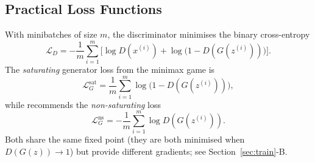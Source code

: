 \documentclass[conference]{IEEEtran}
\theoremstyle{plain}
\theoremstyle{definition}
\begin{document}
\subsection{Practical Loss Functions}
With minibatches of size $m$, the discriminator minimises the binary cross-entropy
\begin{equation}
\mathcal{L}_D=-\frac1m\sum_{i=1}^{m}\Big[\log D(x^{(i)})+\log\big(1-D(G(z^{(i)}))\big)\Big].
\label{eq:LD}
\end{equation}
The \emph{saturating} generator loss from the minimax game is
\begin{equation}
\mathcal{L}_G^{\mathrm{sat}}=\frac1m\sum_{i=1}^{m}\log\big(1-D(G(z^{(i)}))\big),
\label{eq:LGsat}
\end{equation}
while \cite{goodfellow2014gan} recommends the \emph{non-saturating} loss
\begin{equation}
\mathcal{L}_G^{\mathrm{ns}}=-\frac1m\sum_{i=1}^{m}\log D(G(z^{(i)})).
\label{eq:LGns}
\end{equation}
Both share the same fixed point (they are both minimised when $D(G(z))\to1$) but provide different gradients; see Section~\ref{sec:train}-B.
\end{document}
